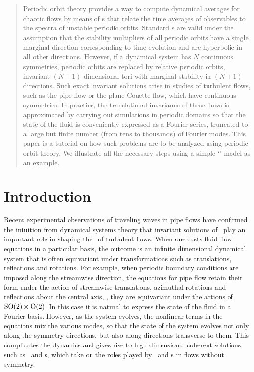 \documentclass[aip,cha,
reprint,
secnumarabic,
nofootinbib, tightenlines,
nobibnotes, showkeys, showpacs,
superscriptaddress,
]{revtex4-1}
\begin{document}
\begin{quotation}
Periodic orbit theory provides a way to compute dynamical averages for
chaotic flows by means of {\cycForm s} that relate the time averages of
observables to the spectra of unstable periodic orbits. Standard
{\cycForm s} are valid under the assumption that the stability
multipliers of all periodic orbits have a single marginal direction
corresponding to time evolution and are hyperbolic in all other
directions. However, if a dynamical system has $N$ continuous symmetries,
periodic orbits are replaced by relative periodic orbits, invariant
$(N+1)$-dimensional tori with marginal stability in $(N+1)$ directions.
Such exact invariant solutions arise in studies of turbulent flows, such
as the pipe flow or the plane Couette flow, which have continuous symmetries.
In practice, the translational invariance of these flows is approximated by
carrying out simulations in periodic domains so that the state of the fluid
is conveniently expressed as a Fourier series, truncated to a large but finite
number (from tens to thousands) of Fourier modes. This paper is a tutorial on
how such problems are to be analyzed using periodic orbit theory. We illustrate
all the necessary steps using a simple `\twomode' model as an example.
\end{quotation}

\section{Introduction}
\label{s:intro}

Recent experimental observations of traveling waves in pipe flows have
confirmed the intuition from dynamical systems theory that invariant solutions
of \NSe\ play an important role in shaping the \statesp\ of turbulent
flows. When one casts fluid flow equations in a
particular basis, the outcome is an infinite dimensional dynamical system
that is often equivariant under transformations such as
translations, reflections and rotations. For example, when periodic
boundary conditions are imposed along the streamwise direction, the equations
for pipe flow retain their form under the action of streamwise translations,
azimuthal rotations and reflections about the central axis, \ie, they are equivariant
under the actions of $\textrm{SO}(2)\times\textrm{O}(2)$. In this case it is natural
to express the state of the fluid in a Fourier basis. However,
as the system evolves, the nonlinear terms in the equations mix the
various modes, so that the state of the system evolves not only along the
symmetry directions, but also along directions transverse to them.
This complicates the dynamics and gives rise to high dimensional coherent
solutions such as \reqva\ and \rpo s, which take on the roles played by
\eqva\ and \po s in flows without symmetry.
\end{document}
